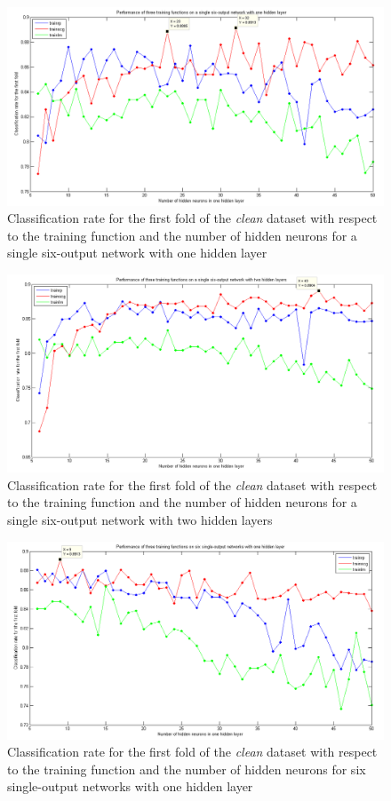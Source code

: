 \documentclass[a4paper]{article}
\begin{document}
\begin{figure}[H]
\center
\includegraphics[width=1\columnwidth]{multiOutput1layer}
\caption{Classification rate for the first fold of the \emph{clean} dataset with respect to the training function and the number of hidden neurons for a single six-output network with one hidden layer}
\label{multiOutput1layer}
\end{figure}

\begin{figure}[H]
\center
\includegraphics[width=1\columnwidth]{multiOutput2layer}
\caption{Classification rate for the first fold of the \emph{clean} dataset with respect to the training function and the number of hidden neurons for a single six-output network with two hidden layers}
\label{multiOutput2layer}
\end{figure}

\begin{figure}[H]
\center
\includegraphics[width=1\columnwidth]{singleOutput1layer}
\caption{Classification rate for the first fold of the \emph{clean} dataset with respect to the training function and the number of hidden neurons for six single-output networks with one hidden layer}
\label{singleOutput1layer}
\end{figure}
\end{document}
